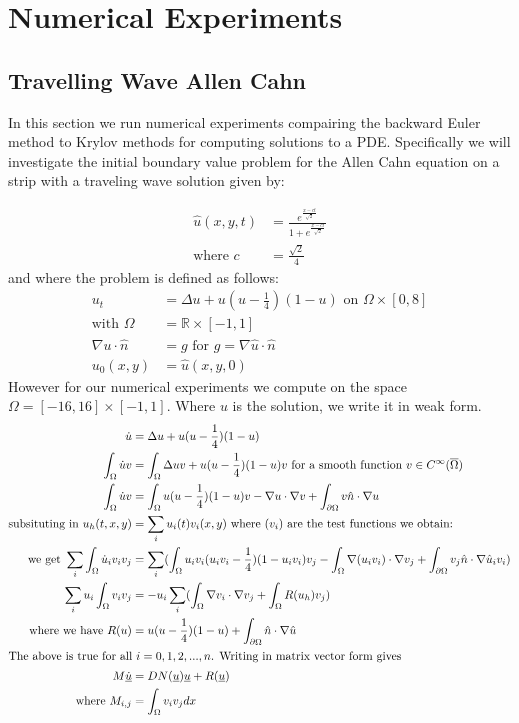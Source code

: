 \section{Numerical Experiments}

\subsection{Travelling Wave Allen Cahn}
In this section we run numerical experiments compairing the backward Euler method to Krylov methods for computing solutions to a PDE.
Specifically we will investigate the initial boundary value problem for the Allen Cahn equation on a strip with a traveling wave solution\cite{YukitakaFukao2004} given by:

\begin{align}
    \hat u(x,y,t)&=\frac{e^{\frac{x-ct}{\sqrt2}}}{1+e^{\frac{x-ct}{\sqrt2}}} \label{TravelingWaveSol}\\
    \text{where } c &= \frac{\sqrt{2}}{4}
\end{align}
and where the problem is defined as follows:
\begin{align*}
    u_t&=\Delta u+u(u-\frac14)(1-u) \text{ on $\Omega \times [0, 8]$}\\
    \text{with } \Omega &= \mathbb{R}\times[-1,1]\\
    \nabla u \cdot \hat n &= g \text{ for $g = \nabla \hat u \cdot \hat n$}\\
    u_0(x, y) &= \hat u(x,y, 0)
\end{align*}
However for our numerical experiments we compute on the space $\Omega=[-16,16]\times[-1,1]$.
Where $u$ is the solution, we write it in weak form.
\begin{align*}
    \dot u&=\Delta u+u(u-\frac14)(1-u)\\
    \int_{\Omega} \dot u v &=\int_{\Omega} \Delta uv+u(u-\frac14)(1-u)v \text{ for a smooth function $v \in C^{\infty}(\overline{\Omega})$}\\
    \int_{\Omega} \dot u v &=\int_{\Omega} u(u-\frac14)(1-u)v - \nabla u \cdot \nabla v + \int_{\partial\Omega}  v\hat n \cdot \nabla u\\
    \text{subsituting in } u_h(t,x,y) &= \sum_i u_i(t) v_i(x,y) \text{ where $(v_i)$ are the test functions we obtain:}\\
    \text{we get } \sum_i\int_{\Omega} \dot u_i v_i v_j &=\sum_i(\int_{\Omega} u_iv_i(u_iv_i-\frac14)(1-u_iv_i)v_j - \int_{\Omega}\nabla (u_iv_i) \cdot \nabla v_j + \int_{\partial\Omega}  v_j\hat n \cdot \nabla \hat u_iv_i)\\
    \sum_iu_i\int_{\Omega}v_iv_j &= -u_i\sum_i(\int_{\Omega}\nabla v_i \cdot \nabla v_j + \int_{\Omega}R(u_h)v_j)\\
    \text{where we have } R(u)&=u(u-\frac14)(1-u) + \int_{\partial\Omega}  \hat n \cdot \nabla \hat  u\\
    \intertext{The above is true for all $i=0,1,2,...,n$. Writing in matrix vector form gives}
    M \underline{\dot u} &= DN(\underline{u})\underline{u} + R(\underline{u})\\
    \text{where } M_{i,j} &= \int_{\Omega}v_iv_jdx
\end{align*}
